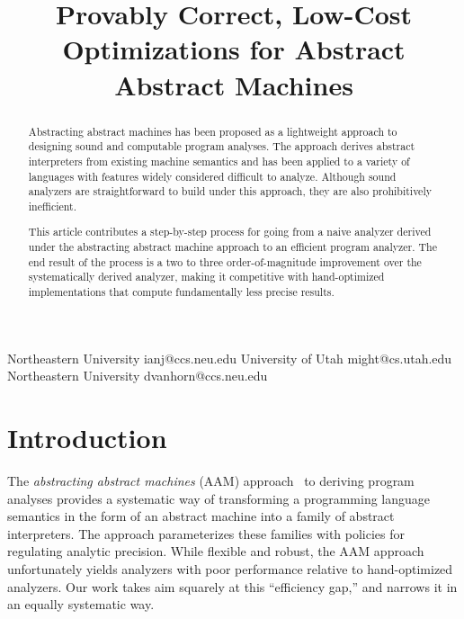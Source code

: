 \documentclass[preprint,onecolumn,9pt]{sigplanconf} %
\newcommand{\naive}{naive}
\begin{document}
\copyrightdata{[to be supplied]}


\title{Provably Correct, Low-Cost Optimizations for Abstract Abstract Machines}

           {Northeastern University}
           {ianj@ccs.neu.edu}
           {University of Utah}
           {might@cs.utah.edu}
           {Northeastern University}
           {dvanhorn@ccs.neu.edu}

\maketitle

\begin{abstract}
Abstracting abstract machines has been proposed as a
lightweight approach to designing sound and computable program
analyses.  The approach derives abstract interpreters from
existing machine semantics and has been applied to a variety of
languages with features widely considered difficult to analyze.
Although sound analyzers are straightforward to build under this approach,
they are also prohibitively inefficient.

This article contributes a step-by-step process for going from a
\naive{} analyzer derived under the abstracting abstract machine
approach to an efficient program analyzer.  The end result of the
process is a two to three order-of-magnitude improvement over the
systematically derived analyzer, making it competitive with
hand-optimized implementations that compute fundamentally less precise
results.
\end{abstract}




\section{Introduction}

The \emph{abstracting abstract machines} (AAM)
approach~\cite{dvanhorn:VanHorn2011Abstracting,dvanhorn:VanHorn2012Systematic}
to deriving program analyses provides a systematic way of transforming a
programming language semantics in the form of an abstract machine into a family
of abstract interpreters.
%
The approach parameterizes these families with policies for regulating analytic
precision.
%
While flexible and robust, the AAM approach unfortunately yields analyzers with
poor performance relative to hand-optimized analyzers.
%
Our work takes aim squarely at this ``efficiency gap,'' and narrows it in an
equally systematic way.
\end{document}
